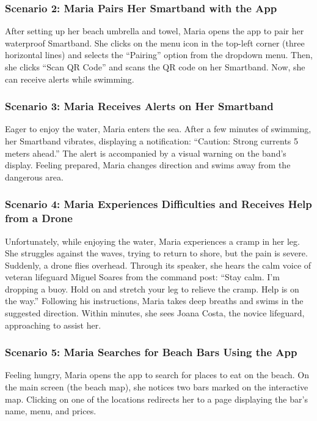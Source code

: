 \subsubsection{\textbf{Scenario 2:} Maria Pairs Her Smartband with the App}
After setting up her beach umbrella and towel, Maria opens the app to pair her waterproof Smartband. She clicks on the menu icon in the top-left corner (three horizontal lines) and selects the ``Pairing'' option from the dropdown menu. Then, she clicks ``Scan QR Code'' and scans the QR code on her Smartband. Now, she can receive alerts while swimming.

\subsubsection{\textbf{Scenario 3:} Maria Receives Alerts on Her Smartband}
Eager to enjoy the water, Maria enters the sea. After a few minutes of swimming, her Smartband vibrates, displaying a notification: “Caution: Strong currents 5 meters ahead.” The alert is accompanied by a visual warning on the band’s display. Feeling prepared, Maria changes direction and swims away from the dangerous area.

\subsubsection{\textbf{Scenario 4:} Maria Experiences Difficulties and Receives Help from a Drone}
Unfortunately, while enjoying the water, Maria experiences a cramp in her leg. She struggles against the waves, trying to return to shore, but the pain is severe. Suddenly, a drone flies overhead. Through its speaker, she hears the calm voice of veteran lifeguard Miguel Soares from the command post: “Stay calm. I’m dropping a buoy. Hold on and stretch your leg to relieve the cramp. Help is on the way.” Following his instructions, Maria takes deep breaths and swims in the suggested direction. Within minutes, she sees Joana Costa, the novice lifeguard, approaching to assist her.

\subsubsection{\textbf{Scenario 5:} Maria Searches for Beach Bars Using the App}
Feeling hungry, Maria opens the app to search for places to eat on the beach. On the main screen (the beach map), she notices two bars marked on the interactive map. Clicking on one of the locations redirects her to a page displaying the bar's name, menu, and prices.

